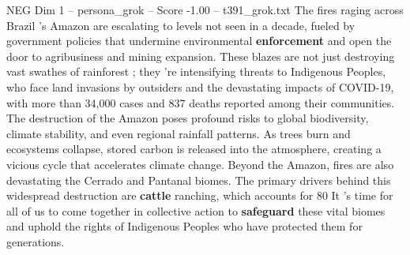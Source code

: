 \begin{textsample}{NEG Dim 1 – persona\_grok – Score -1.00 – t391\_grok.txt}  \label{ex:f1_neg_029}
The fires raging across Brazil 's Amazon are escalating to levels not seen in a decade, fueled by government policies that undermine environmental \textbf{enforcement} and open the door to agribusiness and mining expansion.
These blazes are not just destroying vast swathes of rainforest ; they 're intensifying threats to Indigenous Peoples, who face land invasions by outsiders and the devastating impacts of COVID-19, with more than 34,000 cases and 837 deaths reported among their communities.
The destruction of the Amazon poses profound risks to global biodiversity, climate stability, and even regional rainfall patterns.
As trees burn and ecosystems collapse, stored carbon is released into the atmosphere, creating a vicious cycle that accelerates climate change.
Beyond the Amazon, fires are also devastating the Cerrado and Pantanal biomes.
The primary drivers behind this widespread destruction are \textbf{cattle} ranching, which accounts for 80 %
It 's time for all of us to come together in collective action to \textbf{safeguard} these vital biomes and uphold the rights of Indigenous Peoples who have protected them for generations.

\end{textsample}
